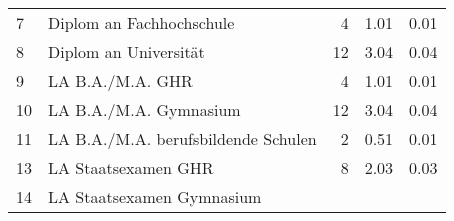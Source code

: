 \begin{longtable}{lXrrr}
     7 &
     \multicolumn{1}{X}{ Diplom an Fachhochschule   } &


       \num{4} &
       \num[round-mode=places,round-precision=2]{1,01} &
         \num[round-mode=places,round-precision=2]{0,01} \\

     8 &
     \multicolumn{1}{X}{ Diplom an Universität   } &


       \num{12} &
       \num[round-mode=places,round-precision=2]{3,04} &
         \num[round-mode=places,round-precision=2]{0,04} \\

     9 &
     \multicolumn{1}{X}{ LA B.A./M.A. GHR   } &


       \num{4} &
       \num[round-mode=places,round-precision=2]{1,01} &
         \num[round-mode=places,round-precision=2]{0,01} \\

     10 &
     \multicolumn{1}{X}{ LA B.A./M.A. Gymnasium   } &


       \num{12} &
       \num[round-mode=places,round-precision=2]{3,04} &
         \num[round-mode=places,round-precision=2]{0,04} \\

     11 &
     \multicolumn{1}{X}{ LA B.A./M.A. berufsbildende Schulen   } &


       \num{2} &
       \num[round-mode=places,round-precision=2]{0,51} &
         \num[round-mode=places,round-precision=2]{0,01} \\

     13 &
     \multicolumn{1}{X}{ LA Staatsexamen GHR   } &


       \num{8} &
       \num[round-mode=places,round-precision=2]{2,03} &
         \num[round-mode=places,round-precision=2]{0,03} \\

     14 &
     \multicolumn{1}{X}{ LA Staatsexamen Gymnasium   } &



\end{longtable}

